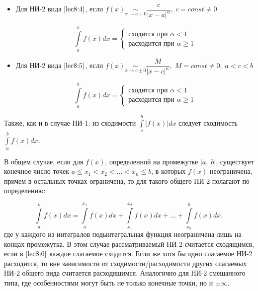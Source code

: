 \documentclass[../../main.tex]{subfiles}
\begin{document}
\begin{enumerate}
\begin{itemize}
\item Для НИ-2 вида $\eqref{lec8:4}$, если $f(x) \underset{x \to a + 0}\sim 
\dfrac{c}{\left|x - a\right|^{\alpha}}, \ c = const \neq 0$

\[\int\limits_{a}^{b}f(x)dx = \begin{cases}
                               \text{сходится при } \alpha < 1\\
                               \text{расходится при } \alpha \geq 1
                              \end{cases}
\]                                                    
                                                    
\item Для НИ-2 вида $\eqref{lec8:5}$, если $f(x) \underset{x \to c \pm 
0}\sim \dfrac{M}{\left|x - c\right|^{\alpha}}, \; M = const \neq 0,\; a < c < 
b$

\[\int\limits_{a}^{b}f(x)dx = \begin{cases}
                               \text{сходится при } \alpha < 1\\
                               \text{расходится при } \alpha \geq 1
                              \end{cases}
\]
 \end{itemize}
\end{enumerate}


Также, как и в случае НИ-1: из сходимости 
$\displaystyle\int\limits_{a}^{b}\left|f(x)\right|dx$ следует сходимость 
$\displaystyle\int\limits_{a}^{b}f(x)dx$.

В общем случае, если для $f(x)$, определенной на промежутке $\left|a, \; 
b\right|$, существует конечное число точек $a \leq x_1 < x_2 < \ldots < x_n 
\leq b$, в которых $f(x)$ неограничена, причем в остальных точках 
ограничена, то для такого общего НИ-2 полагают по определению:

\begin{equation} \label{lec8:6}
\int\limits_{a}^{b}f(x)dx = \int\limits_{a}^{x_1}f(x)dx + 
\int\limits_{x_1}^{x_2}f(x)dx + \ldots + \int\limits_{x_n}^{b}f(x)dx,
\end{equation}
где у каждого из интегралов подынтегральная функция неограничена лишь на 
концах промежутка. В этом случае рассматриваемый НИ-2 считается сходящимся, 
если в $\eqref{lec8:6}$ каждое слагаемое сходится. Если же хотя бы одно 
слагаемое НИ-2 расходится, то вне зависимости от сходимости/расходимости 
других слагаемых НИ-2 общего вида считается расходящимся. Аналогично для НИ-2 
смешанного типа, где особенностями могут быть не только конечные точки, но и 
$\pm\infty$.
\end{document}
